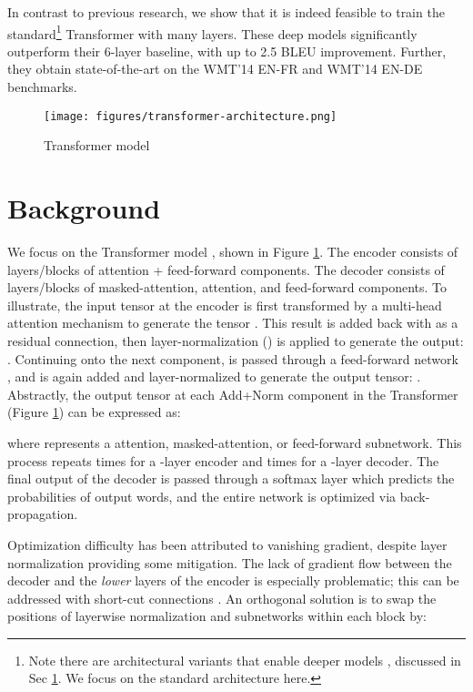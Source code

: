 \documentclass[11pt,a4paper]{article}
\begin{document}
In contrast to previous research, we show that it is indeed feasible to train the standard\footnote{Note there are architectural variants that enable deeper models \cite{wang2019preln,Nguyen2019fixnorm}, discussed in Sec \ref{sec:prelimiary}. We focus on the standard architecture here.} Transformer \cite{vaswani2017attention} with many layers. 
These deep models significantly outperform their 6-layer baseline, with up to 2.5 BLEU improvement. Further, they obtain state-of-the-art on the WMT'14 EN-FR and WMT'14 EN-DE benchmarks. 

\begin{figure}[t]
    \centering
    \texttt{[image: figures/transformer-architecture.png]}
    \caption{Transformer model}
    \label{fig:transformer}
    \vspace{-4mm}
\end{figure}


\section{Background}
\label{sec:prelimiary}

We focus on the Transformer model \cite{vaswani2017attention}, shown in Figure \ref{fig:transformer}. 
The encoder consists of  layers/blocks of attention + feed-forward components. The decoder consists of  layers/blocks of masked-attention, attention, and feed-forward components. 
To illustrate, the input tensor  at the encoder is first transformed by a multi-head attention mechanism to generate the tensor . This result is added back with  as a residual connection, then layer-normalization () is applied to generate the output:
.
Continuing onto the next component,  is passed through a feed-forward network , and is again added and layer-normalized to generate the output tensor: 
.
Abstractly, the output tensor at each Add+Norm component in the Transformer (Figure \ref{fig:transformer}) can be expressed as: 

where  represents a attention, masked-attention, or feed-forward subnetwork. 
This process repeats  times for a -layer encoder and  times for a -layer decoder.
The final output of the decoder is passed through a softmax layer which predicts the probabilities of output words, and the entire network is optimized via back-propagation. 

Optimization difficulty has been attributed to vanishing gradient, despite layer normalization \cite{xu2019improveln} providing some mitigation. 
The lack of gradient flow between the decoder and the {\em lower} layers of the encoder is especially problematic; this can be addressed with short-cut connections \cite{bapna2018training,he2018layer-wise}.
An orthogonal solution is to swap the positions of layerwise normalization  and subnetworks  within each block \cite{Nguyen2019fixnorm,domhan2018ananmt,chen2018-best-adv-nmt} by:  
\end{document}
